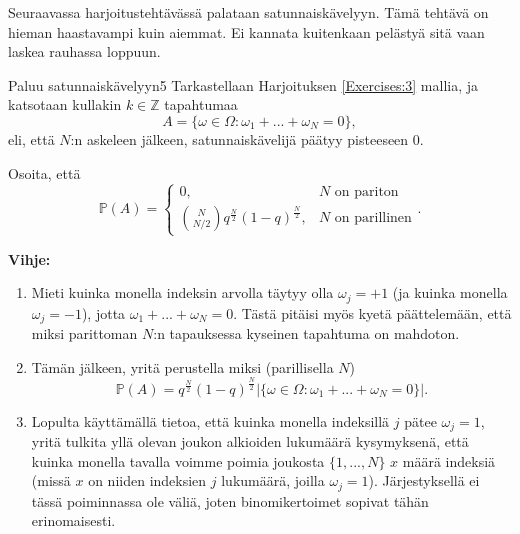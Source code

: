 \documentclass[11pt,a4paper]{amsart}
\newcommand{\Z}{\mathbb{Z}}
\newcommand{\1}{\mathbf{1}}
\renewcommand{\P}{\mathbb P}
\begin{document}
Seuraavassa harjoitustehtävässä palataan satunnaiskävelyyn. Tämä tehtävä on hieman haastavampi kuin aiemmat. Ei kannata kuitenkaan pelästyä sitä vaan laskea rauhassa loppuun.

\begin{Exercises}{Paluu satunnaiskävelyyn}{5}
Tarkastellaan Harjoituksen \ref{Exercises:3} mallia, ja katsotaan kullakin $k\in \Z$ tapahtumaa 
\[
A=\{\omega\in \Omega: \omega_1+...+\omega_N=0\},
\]
eli, että $N$:n askeleen jälkeen, satunnaiskävelijä päätyy pisteeseen $0$. 

Osoita, että 
\[
\P(A)=\begin{cases}
0, & N \text{ on pariton}\\
{N\choose N/2}q^{\frac{N}{2}}(1-q)^{\frac{N}{2}}, & N \text{ on parillinen}
\end{cases}.
\]

{\bf Vihje:}  

\begin{enumerate}
\item Mieti kuinka monella indeksin arvolla täytyy olla $\omega_j=+1$ (ja kuinka monella $\omega_j=-1$), jotta $\omega_1+...+\omega_N=0$. Tästä pitäisi myös kyetä päättelemään, että miksi parittoman $N$:n tapauksessa kyseinen tapahtuma on mahdoton.
\item Tämän jälkeen, yritä perustella miksi  (parillisella $N$)
\[
\P(A)=q^{\frac{N}{2}}(1-q)^{\frac{N}{2}}|\{\omega\in \Omega:\omega_1+...+\omega_N=0\}|.
\]
\item Lopulta käyttämällä tietoa, että kuinka monella indeksillä $j$ pätee $\omega_j=1$, yritä tulkita yllä olevan joukon alkioiden lukumäärä kysymyksenä, että kuinka monella tavalla voimme poimia joukosta $\{1,...,N\}$ $x$ määrä indeksiä (missä $x$ on niiden indeksien $j$ lukumäärä, joilla $\omega_j=1$). Järjestyksellä ei tässä poiminnassa ole väliä, joten binomikertoimet sopivat tähän erinomaisesti.
\end{enumerate}
\end{Exercises}
\end{document}
